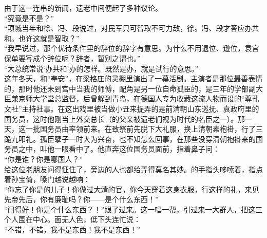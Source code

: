 由于这一连串的新闻，遗老中间便起了多种议论。\\

“究竟是不是？”\\

“项城当年和徐、冯、段说过，对民军只可智取不可力敌，徐。冯、段才答应办共和。也许这就是智取？”\\

“我早说过，那个优待条件里的辞位的辞字有意思。为什么不用退位、逊位，袁宫保单要写成个辞位呢？辞者，暂别之谓也。”\\

“大总统常说‘办共和’办的怎样。既然是办，就是试行的意思。”\\

这年冬天，和“奉安”，在梁格庄的灵棚里演出了一幕活剧。主演者是那位最善表情的，那时他还未到宫中当我的师傅，配角是另一位自命孤臣的，是三年的学部副大臣兼京师大学堂总监督，后曾躲到青岛，在德国人专为收藏这流人物而设的“尊孔文社”主持社事。在这出戏里被当做小丑来捉弄的是前清朝山东巡抚、袁政府里的国务员，这时他刚当上外交总长（的父亲被遗老们视为时代的名臣之一）。那一天，这一批国务员由率领前来。在致祭前先脱下大礼服，换上清朝素袍褂，行了三跪九叩礼。孤臣孽子一时大为兴奋，也不知怎么回事，在那些没穿清朝袍褂来的国务员之中，叫他一眼看中了。他直奔这位国务员面前，指着鼻子问：\\

“你是谁？你是哪国人？”\\

给这位老朋友问得怔住了，旁边的人也都给弄得莫名其妙。的手指头哆嗦着，指点着孙宝倚，嗓门越说越响：\\

“你忘了你是的儿子！你做过大清的官，你今天穿着这身衣服，行这样的礼，来见先帝先后，你有廉耻吗？你——是个什么东西！”\\

“问得好！你是个什么东西？！”跟了过来。这一唱一帮，引过来一大群人，把这三个人围在中心。面无人色，低下头连忙说：\\

“不错，不错，我不是东西！我不是东西！”\\

